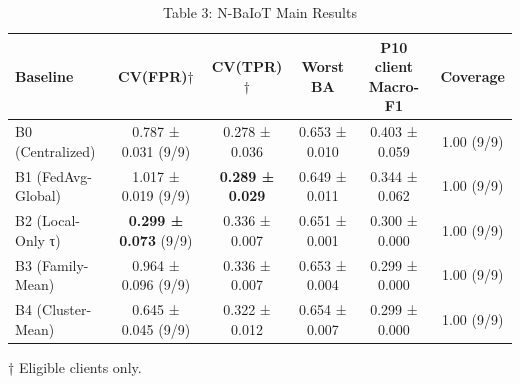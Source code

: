 \begin{table}[htbp]
\caption{Table 3: N-BaIoT Main Results}
\centering
\begin{tabular}{l c c c c c}
\toprule
Baseline & CV(FPR)$\dagger$ & CV(TPR)$\dagger$ & Worst BA & P10 client Macro-F1 & Coverage \\
\midrule
B0 (Centralized) & 0.787 ± 0.031 (9/9) & 0.278 ± 0.036 & 0.653 ± 0.010 & 0.403 ± 0.059 & 1.00 (9/9) \\
B1 (FedAvg-Global) & 1.017 ± 0.019 (9/9) & \textbf{0.289 ± 0.029} & 0.649 ± 0.011 & 0.344 ± 0.062 & 1.00 (9/9) \\
B2 (Local-Only τ) & \textbf{0.299 ± 0.073} (9/9) & 0.336 ± 0.007 & 0.651 ± 0.001 & 0.300 ± 0.000 & 1.00 (9/9) \\
B3 (Family-Mean) & 0.964 ± 0.096 (9/9) & 0.336 ± 0.007 & 0.653 ± 0.004 & 0.299 ± 0.000 & 1.00 (9/9) \\
B4 (Cluster-Mean) & 0.645 ± 0.045 (9/9) & 0.322 ± 0.012 & 0.654 ± 0.007 & 0.299 ± 0.000 & 1.00 (9/9) \\
\bottomrule
\end{tabular}

\footnotesize{† Eligible clients only.}

\end{table}